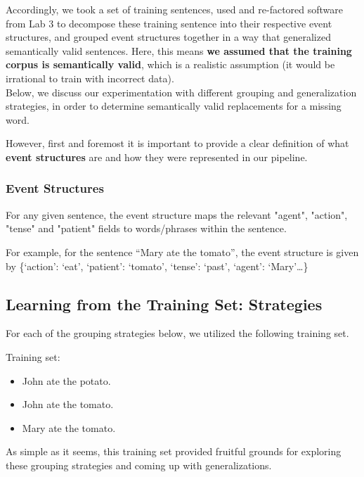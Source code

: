 \documentclass{article}[12pt]
\theoremstyle{definition}
\begin{document}
Accordingly, we took a set of training sentences, used and re-factored software from Lab 3 to decompose these training sentence into their respective event structures, and grouped event structures together in a way that generalized semantically valid sentences. Here, this means \textbf{we assumed that the training corpus is semantically valid}, which is a realistic assumption (it would be irrational to train with incorrect data). \\

Below, we discuss our experimentation with different grouping and generalization strategies, in order to determine semantically valid replacements for a missing word.

However, first and foremost it is important to provide a clear definition of what \textbf{event structures} are and how they were represented in our pipeline. 

\subsubsection{Event Structures}

For any given sentence, the event structure maps the relevant "agent", "action", "tense" and "patient" fields to words/phrases within the sentence. 

For example, for the sentence ``Mary ate the tomato'', the event structure is given by \{{`action': `eat', `patient': `tomato', `tense': `past', `agent': `Mary'}…\}



\subsection{Learning from the Training Set: Strategies}

For each of the grouping strategies below, we utilized the following training set. 

Training set: 

\begin{itemize}
  \item John ate the potato.
  \item John ate the tomato.
  \item Mary ate the tomato.
\end{itemize}

As simple as it seems, this training set provided fruitful grounds for exploring these grouping strategies and coming up with generalizations. \\
\end{document}
